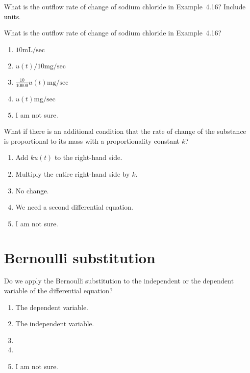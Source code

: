 \documentclass[t, 14pt]{beamer}
\begin{document}
\begin{frame}[c]
  What is the outflow rate of change of sodium chloride in Example~4.16? Include units.
\end{frame}

\begin{frame}[c]
  What is the outflow rate of change of sodium chloride in Example~4.16?

  \begin{enumerate}
    \item \(10 \text{mL}/\text{sec}\) 
    \item \(u(t)/10 \text{mg}/\text{sec}\) 
    \item \(\frac{10}{10000} u(t) \text{mg}/\text{sec}\) 
    \item \(u(t) \text{mg}/\text{sec}\) 
    \item I am not sure.
  \end{enumerate}
\end{frame}

\begin{frame}[c]
  What if there is an additional condition that the rate of change of the substance is proportional to its mass with a proportionality constant \(k\)?

  \begin{enumerate}
    \item Add \(k u(t)\) to the right-hand side.
    \item Multiply the entire right-hand side by \(k\).
    \item No change.
    \item We need a second differential equation.
    \item I am not sure.
  \end{enumerate}
\end{frame}

\section{Bernoulli substitution}

\begin{frame}[t]
  Do we apply the Bernoulli substitution to the independent or the dependent variable of the differential equation?

  \begin{enumerate} 
    \item The dependent variable.
    \item The independent variable.
    \item 
    \item 
    \item I am not sure.
  \end{enumerate} 
\end{frame}
\end{document}
